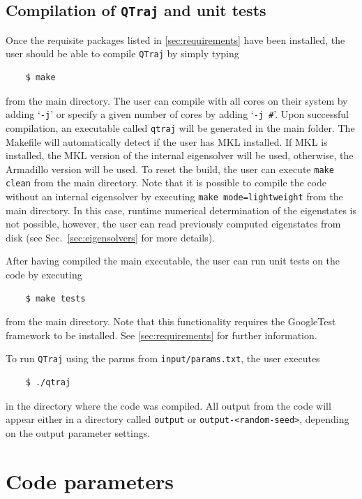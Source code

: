 \documentclass[times,sort&compress,final]{elsarticle}
\def\qtraj{{\tt QTraj} }
\begin{document}
\subsection{Compilation of \qtraj and unit tests}
\label{subsec:finalcompilation}

Once the requisite packages listed in \ref{sec:requirements} have been installed, the user should be able to compile \qtraj by simply typing
%
\begin{verbatim}
    $ make
\end{verbatim}
%
from the main directory.  The user can compile with all cores on their system by adding `{\tt -j}' or specify a given number of cores by adding `{\tt -j \#}'.  Upon successful compilation, an executable called {\tt qtraj} will be generated in the main folder.  The Makefile will automatically detect if the user has MKL installed.  If MKL is installed, the MKL version of the internal eigensolver will be used, otherwise, the Armadillo version will be used.  To reset the build, the user can execute 
{\tt make clean} from the main directory. Note that it is possible to compile the code without an internal eigensolver by executing {\tt make mode=lightweight} from the main directory.  In this case, runtime numerical determination of the eigenstates is not possible, however, the user can read previously computed eigenstates from disk (see Sec.~\ref{sec:eigensolvers} for more details).

After having compiled the main executable, the user can run unit tests on the code by executing
%
\begin{verbatim}
    $ make tests
\end{verbatim}
%
from the main directory.  Note that this functionality requires the GoogleTest framework to be installed.  See \ref{sec:requirements} for further information.

To run \qtraj using the parms from {\tt input/params.txt}, the user executes
%
\begin{verbatim}
    $ ./qtraj
\end{verbatim}
%
in the directory where the code was compiled.  
All output from the code will appear either in a directory called {\tt output} or {\tt output-<random-seed>}, depending on the output parameter settings.  

\section{Code parameters}
\label{sec:params}
\end{document}

